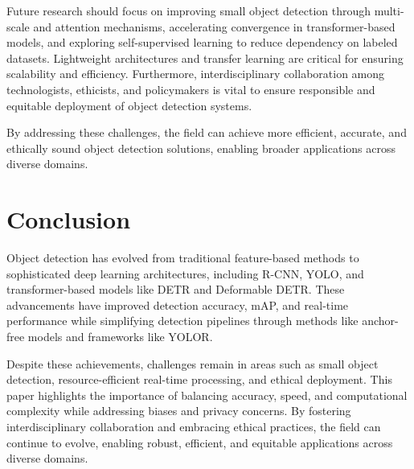 \documentclass[3p,times]{elsarticle}
\begin{document}
Future research should focus on improving small object detection through multi-scale and attention mechanisms, accelerating convergence in transformer-based models, and exploring self-supervised learning to reduce dependency on labeled datasets. Lightweight architectures and transfer learning are critical for ensuring scalability and efficiency. Furthermore, interdisciplinary collaboration among technologists, ethicists, and policymakers is vital to ensure responsible and equitable deployment of object detection systems.

By addressing these challenges, the field can achieve more efficient, accurate, and ethically sound object detection solutions, enabling broader applications across diverse domains.


\section{Conclusion} \label{conclusion}
Object detection has evolved from traditional feature-based methods to sophisticated deep learning architectures, including R-CNN, YOLO, and transformer-based models like DETR and Deformable DETR. These advancements have improved detection accuracy, mAP, and real-time performance while simplifying detection pipelines through methods like anchor-free models and frameworks like YOLOR.

Despite these achievements, challenges remain in areas such as small object detection, resource-efficient real-time processing, and ethical deployment. This paper highlights the importance of balancing accuracy, speed, and computational complexity while addressing biases and privacy concerns. By fostering interdisciplinary collaboration and embracing ethical practices, the field can continue to evolve, enabling robust, efficient, and equitable applications across diverse domains.
\footnotesize{


}   
\end{document}
